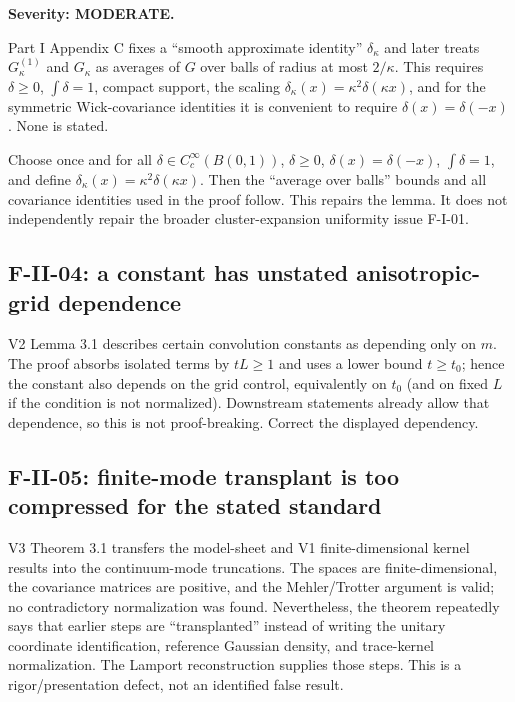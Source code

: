 \documentclass[11pt,a4paper]{article}
\begin{document}
\begin{finding}
\textbf{Severity: \textbf{MODERATE}.}

Part I Appendix C fixes a ``smooth approximate identity'' $\delta_\kappa$ and later
treats $G^{(1)}_\kappa$ and $G_\kappa$ as averages of $G$ over balls of radius at most
$2/\kappa$.  This requires $\delta\ge0$, $\int\delta=1$, compact support, the scaling
$\delta_\kappa(x)=\kappa^2\delta(\kappa x)$, and for the symmetric Wick-covariance
identities it is convenient to require $\delta(x)=\delta(-x)$.  None is stated.
\end{finding}

Choose once and for all
$\delta\in C_c^\infty(B(0,1))$, $\delta\ge0$, $\delta(x)=\delta(-x)$,
$\int\delta=1$, and define $\delta_\kappa(x)=\kappa^2\delta(\kappa x)$.  Then the
``average over balls'' bounds and all covariance identities used in the proof follow.
This repairs the lemma.  It does not independently repair the broader cluster-expansion
uniformity issue F-I-01.

\subsection{F-II-04: a constant has unstated anisotropic-grid dependence}

V2 Lemma 3.1 describes certain convolution constants as depending only on $m$.  The
proof absorbs isolated terms by $tL\ge1$ and uses a lower bound $t\ge t_0$; hence the
constant also depends on the grid control, equivalently on $t_0$ (and on fixed $L$ if
the condition is not normalized).  Downstream statements already allow that dependence,
so this is not proof-breaking.  Correct the displayed dependency.

\subsection{F-II-05: finite-mode transplant is too compressed for the stated standard}

V3 Theorem 3.1 transfers the model-sheet and V1 finite-dimensional kernel results into
the continuum-mode truncations.  The spaces are finite-dimensional, the covariance
matrices are positive, and the Mehler/Trotter argument is valid; no contradictory
normalization was found.  Nevertheless, the theorem repeatedly says that earlier steps
are ``transplanted'' instead of writing the unitary coordinate identification, reference
Gaussian density, and trace-kernel normalization.  The Lamport reconstruction supplies
those steps.  This is a rigor/presentation defect, not an identified false result.
\end{document}
